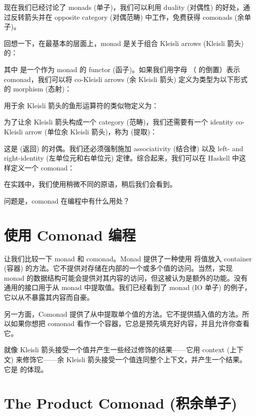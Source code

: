 
\lettrine[lhang=0.17]{现}{在我们已经讨论了} monads (单子)，我们可以利用 duality (对偶性) 的好处，通过反转箭头并在 opposite category (对偶范畴) 中工作，免费获得 comonads (余单子)。

回想一下，在最基本的层面上，monad 是关于组合 Kleisli arrows (Kleisli 箭头) 的：

其中  是一个作为 monad 的 functor (函子)。如果我们用字母 （ 的倒置）表示 comonad，我们可以将 co-Kleisli arrows (余 Kleisli 箭头) 定义为类型为以下形式的 morphism (态射)：

用于余 Kleisli 箭头的鱼形运算符的类似物定义为：

为了让余 Kleisli 箭头构成一个 category (范畴)，我们还需要有一个 identity co-Kleisli arrow (单位余 Kleisli 箭头)，称为  (提取)：

这是  (返回) 的对偶。我们还必须强制施加 associativity (结合律) 以及 left- and right-identity (左单位元和右单位元) 定律。综合起来，我们可以在 Haskell 中这样定义一个 comonad：

在实践中，我们使用稍微不同的原语，稍后我们会看到。

问题是，comonad 在编程中有什么用处？

\section{使用 Comonad 编程}

让我们比较一下 monad 和 comonad。Monad 提供了一种使用  将值放入 container (容器) 的方法。它不提供对存储在内部的一个或多个值的访问。当然，实现 monad 的数据结构可能会提供对其内容的访问，但这被认为是额外的功能。没有通用的接口用于从 monad 中提取值。我们已经看到了  monad (IO 单子) 的例子，它以从不暴露其内容而自豪。

另一方面，Comonad 提供了从中提取单个值的方法。它不提供插入值的方法。所以如果你想把 comonad 看作一个容器，它总是预先填充好内容，并且允许你查看它。

就像 Kleisli 箭头接受一个值并产生一些经过修饰的结果——它用 context (上下文) 来修饰它——余 Kleisli 箭头接受一个值连同整个上下文，并产生一个结果。它是  的体现。

\section{The Product Comonad (积余单子)}

